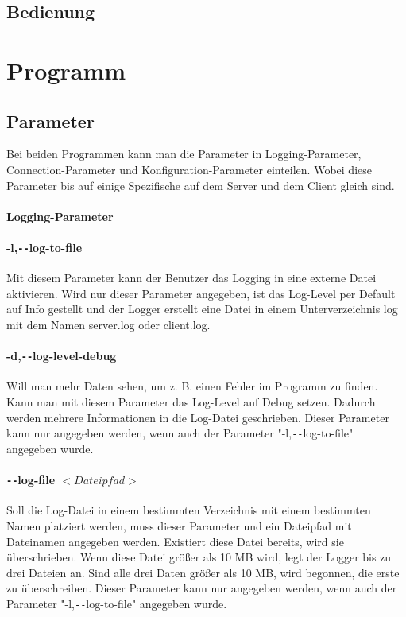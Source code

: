 \documentclass[a4paper,12pt,titlepage]{scrartcl}
\begin{document}


\subsection{Bedienung} %


\section{Programm}

\subsection{Parameter}
Bei beiden Programmen kann man die Parameter in Logging-Parameter, Connection-Parameter und Konfiguration-Parameter einteilen. Wobei diese Parameter bis auf einige Spezifische auf dem Server und dem Client gleich sind.

\paragraph{Logging-Parameter}

\paragraph{-l,\texttt{-{}-}log-to-file}
Mit diesem Parameter kann der Benutzer das Logging in eine externe Datei aktivieren. Wird nur dieser Parameter angegeben, ist das Log-Level per Default auf Info gestellt und der Logger erstellt eine Datei in einem Unterverzeichnis log mit dem Namen server.log oder client.log.

\paragraph{-d,\texttt{-{}-}log-level-debug}
Will man mehr Daten sehen, um z. B. einen Fehler im Programm zu finden. Kann man mit diesem Parameter das Log-Level auf Debug setzen. Dadurch werden mehrere Informationen in die Log-Datei geschrieben. Dieser Parameter kann nur angegeben werden, wenn auch der Parameter "-l,\texttt{-{}-}log-to-file" angegeben wurde.

\paragraph{\texttt{-{}-}log-file $<Dateipfad>$}
Soll die Log-Datei in einem bestimmten Verzeichnis mit einem bestimmten Namen platziert werden, muss dieser Parameter und ein Dateipfad mit Dateinamen angegeben werden. Existiert diese Datei bereits, wird sie überschrieben. Wenn diese Datei größer als 10 MB wird, legt der Logger bis zu drei Dateien an. Sind alle drei Daten größer als 10 MB, wird begonnen, die erste zu überschreiben. Dieser Parameter kann nur angegeben werden, wenn auch der Parameter "-l,\texttt{-{}-}log-to-file" angegeben wurde.
\end{document}
